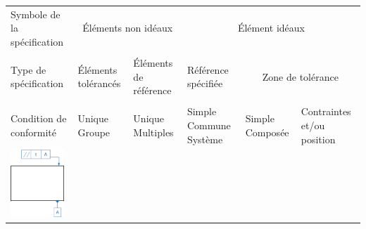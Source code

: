 \documentclass[11pt,oneside]{article}
\begin{document}
\begin{exemple}
\footnotesize{
\begin{center}
\begin{tabular}{|p{}|p{}|p{}|p{}|p{}|p{}|}
\hline
Symbole de la spécification & 
\multicolumn{2}{c|}{Éléments non idéaux} &
\multicolumn{3}{c|}{Élément idéaux} \\
&
\multicolumn{2}{c|}{} &
\multicolumn{3}{c|}{}\\
\hline
Type de spécification & 
Éléments tolérancés &
Éléments de référence & 
Référence spécifiée & 
\multicolumn{2}{c|}{Zone de tolérance} \\
&&&&
\multicolumn{2}{c|}{}\\
\hline
Condition de conformité & 
Unique Groupe & Unique Multiples &
Simple Commune Système &
Simple Composée & 
Contraintes et/ou position \\
\hline
\multirow{12}{*}{\includegraphics[width=2cm]{png/ex_parallelisme}}&&&&&\\
&&&&&\\
&&&&&\\
&&&&&\\
&&&&&\\
&&&&&\\
&&&&&\\
&&&&&\\
&&&&&\\
&&&&&\\
&&&&&\\
&&&&&\\
\hline
\end{tabular}
\end{center}
}
\end{exemple}
\end{document}
